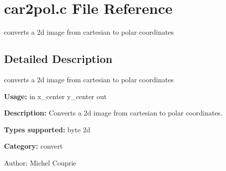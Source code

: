 \section{car2pol.c File Reference}
\label{car2pol_8c}
converts a 2d image from cartesian to polar coordinates  




\label{_details}
\subsection{Detailed Description}
converts a 2d image from cartesian to polar coordinates 

{\bf Usage:} in x\_\-center y\_\-center out

{\bf Description:} Converts a 2d image from cartesian to polar coordinates.

{\bf Types supported:} byte 2d

{\bf Category:} convert

\begin{Desc}
\item[Author:]Michel Couprie \end{Desc}
